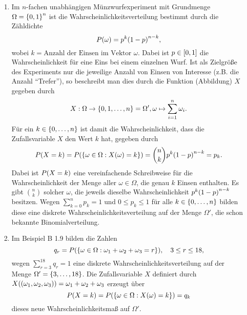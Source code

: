 \documentclass{lecture}
\begin{document}
    \begin{example}
        \begin{enumerate}
            \item Im \(n\)-fachen unabhängigen Münzwurfexperiment mit Grundmenge \(\Omega = \braces*{0, 1}^n\) ist die Wahrscheinlichkeitsverteilung bestimmt durch die Zähldichte
            \[
                P\parentheses*{\omega} = p^k\parentheses*{1 - p}^{n - k},
            \]
            wobei \(k = \text{Anzahl der Einsen im Vektor }\omega\).
            Dabei ist \(p \in \brackets*{0, 1}\) die Wahrscheinlichkeit für eine Eins bei einem einzelnen Wurf.
            Ist als Zielgröße des Experiments nur die jeweilige Anzahl von Einsen von Interesse (z.B. die Anzahl ``Trefer''), so beschreibt man dies durch die Funktion (Abbildung) \(X\) gegeben durch
            \[
                X: \Omega \to \braces*{0, 1, \ldots, n} = \Omega', \omega \mapsto \sum_{i = 1}^n \omega_i.
            \]
            Für ein \(k \in \braces*{0, \ldots, n}\) ist damit die Wahrscheinlichkeit, dass die Zufallsvariable \(X\) den Wert \(k\) hat, gegeben durch
            \[
                P\parentheses*{X = k} = P\parentheses*{\braces*{\omega \in \Omega : X\parentheses*{\omega} = k}} = \binom{n}{k}p^k\parentheses*{1 - p}^{n - k} = p_k.
            \]
            Dabei ist \(P\parentheses*{X = k}\)  eine vereinfachende Schreibweise für die Wahrscheinlichkeit der Menge aller \(\omega \in \Omega\), die genau \(k\) Einsen enthalten.
            Es gibt \(\binom{n}{k}\) solcher \(\omega\), die jeweils dieselbe Wahrscheinlichkeit \(p^k\parentheses*{1 - p}^{n - k}\) besitzen.
            Wegen \(\sum_{k = 0}^n p_k = 1\) und \(0 \le p_k \le 1\) für alle \(k \in \braces*{0, \ldots, n}\) bilden diese eine diskrete Wahrscheinlichkeitsverteilung auf der Menge \(\Omega'\), die schon bekannte Binomialverteilung.
            \item Im Beispiel B 1.9 bilden die Zahlen
            \[
                q_r = P\parentheses*{\braces*{\omega \in \Omega : \omega_1 + \omega_2 + \omega_3 = r}}, \quad 3 \le r \le 18,
            \]
            wegen \(\sum_{r = 3}^{18}q_r = 1\) eine diskrete Wahrscheinlichkeitsverteilung auf der Menge \(\Omega' = \braces*{3, \ldots, 18}\).
            Die Zufallsvariable \(X\) definiert durch \(X\parentheses*{\parentheses*{\omega_1, \omega_2, \omega_3}} = \omega_1 + \omega_2 + \omega_3\) erzeugt über
            \[
                P\parentheses*{X = k} = P\parentheses*{\braces*{\omega \in \Omega : X\parentheses*{\omega} = k}} = q_k
            \]
            dieses neue Wahrscheinlichkeitsmaß auf \(\Omega'\).
        \end{enumerate}
    \end{example}
\end{document}
